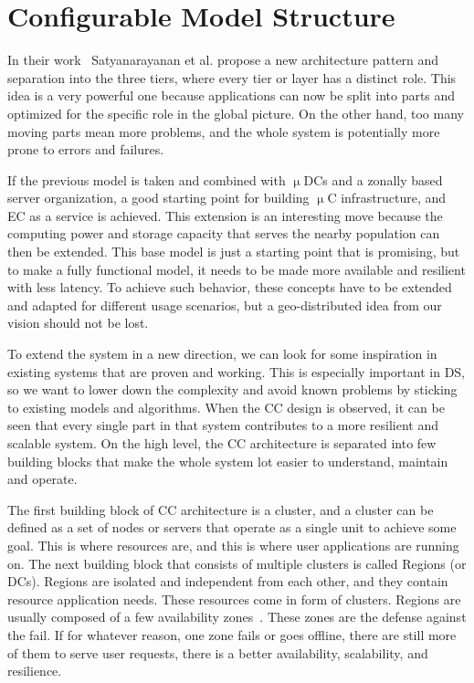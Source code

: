 \section{Configurable Model Structure}\label{sec:configurable_model_structure}
%
In their work~\cite{SatyanarayananK19} Satyanarayanan et al. propose a new architecture pattern and separation into the three tiers, where every tier or layer has a distinct role. This idea is a very powerful one because applications can now be split into parts and optimized for the specific role in the global picture. On the other hand, too many moving parts mean more problems, and the whole system is potentially more prone to errors and failures.

If the previous model is taken and combined with $\upmu$DCs and a zonally based server organization, a good starting point for building $\upmu$C infrastructure, and EC as a service is achieved. This extension is an interesting move because the computing power and storage capacity that serves the nearby population can then be extended. This base model is just a starting point that is promising, but to make a fully functional model, it needs to be made more available and resilient with less latency. To achieve such behavior, these concepts have to be extended and adapted for different usage scenarios, but a geo-distributed idea from our vision should not be lost.

To extend the system in a new direction, we can look for some inspiration in existing systems that are proven and working. This is especially important in DS, so we want to lower down the complexity and avoid known problems by sticking to existing models and algorithms. When the CC design is observed, it can be seen that every single part in that system contributes to a more resilient and scalable system. On the high level, the CC architecture is separated into few building blocks that make the whole system lot easier to understand, maintain and operate.

The first building block of CC architecture is a cluster, and a cluster can be defined as a set of nodes or servers that operate as a single unit to achieve some goal. This is where resources are, and this is where user applications are running on. The next building block that consists of multiple clusters is called Regions (or DCs). Regions are isolated and independent from each other, and they contain resource application needs. These resources come in form of clusters. Regions are usually composed of a few availability zones~\cite{SouzaMFAK19}. These zones are the defense against the fail. If for whatever reason, one zone fails or goes offline, there are still more of them to serve user requests, there is a better availability, scalability, and resilience.

